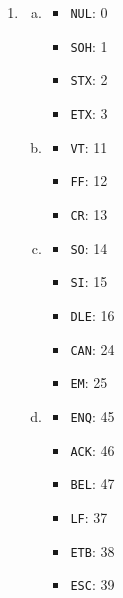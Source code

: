 \documentclass[12pt]{article}
\begin{document}
\begin{enumerate}[1.]
        \item

        \begin{enumerate}[a)]
            \item

            \begin{itemize}
                \item \texttt{NUL}: 0
                \item \texttt{SOH}: 1
                \item \texttt{STX}: 2
                \item \texttt{ETX}: 3
            \end{itemize}

            \item

            \begin{itemize}
                \item \texttt{VT}: 11
                \item \texttt{FF}: 12
                \item \texttt{CR}: 13
            \end{itemize}

            \item

            \begin{itemize}
                \item \texttt{SO}: 14
                \item \texttt{SI}: 15
                \item \texttt{DLE}: 16
                \item \texttt{CAN}: 24
                \item \texttt{EM}: 25
            \end{itemize}

            \item

            \begin{itemize}
                \item \texttt{ENQ}: 45
                \item \texttt{ACK}: 46
                \item \texttt{BEL}: 47
                \item \texttt{LF}: 37
                \item \texttt{ETB}: 38
                \item \texttt{ESC}: 39
            \end{itemize}
        \end{enumerate}


\end{enumerate}
\end{document}
